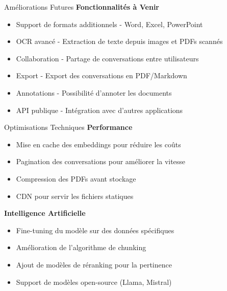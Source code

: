\documentclass[aspectratio=169]{beamer}
\begin{document}
\begin{frame}{Améliorations Futures}
    \textbf{Fonctionnalités à Venir}
    \begin{itemize}
        \item \textcolor{primaryblue}{Support de formats additionnels} - Word, Excel, PowerPoint
        \item \textcolor{primaryblue}{OCR avancé} - Extraction de texte depuis images et PDFs scannés
        \item \textcolor{primaryblue}{Collaboration} - Partage de conversations entre utilisateurs
        \item \textcolor{primaryblue}{Export} - Export des conversations en PDF/Markdown
        \item \textcolor{primaryblue}{Annotations} - Possibilité d'annoter les documents
        \item \textcolor{primaryblue}{API publique} - Intégration avec d'autres applications
    \end{itemize}
\end{frame}

\begin{frame}{Optimisations Techniques}
    \textbf{Performance}
    \begin{itemize}
        \item Mise en cache des embeddings pour réduire les coûts
        \item Pagination des conversations pour améliorer la vitesse
        \item Compression des PDFs avant stockage
        \item CDN pour servir les fichiers statiques
    \end{itemize}
    
    \vspace{0.5cm}
    
    \textbf{Intelligence Artificielle}
    \begin{itemize}
        \item Fine-tuning du modèle sur des données spécifiques
        \item Amélioration de l'algorithme de chunking
        \item Ajout de modèles de réranking pour la pertinence
        \item Support de modèles open-source (Llama, Mistral)
    \end{itemize}
\end{frame}
\end{document}
